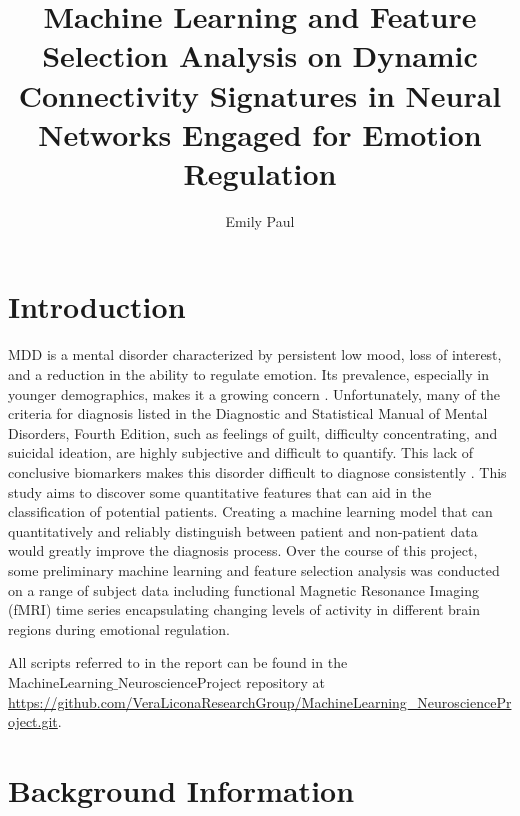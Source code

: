 \documentclass[12pt]{report}
\title{Machine Learning and Feature Selection Analysis on Dynamic Connectivity Signatures in Neural Networks Engaged for Emotion Regulation}
\author{Emily Paul}
\begin{document}
	
	\maketitle
	\tableofcontents
	
	\chapter{Introduction}
	MDD is a mental disorder characterized by persistent low mood, loss of interest, and a reduction in the ability to regulate emotion. Its prevalence, especially in younger demographics, makes it a growing concern \cite{nimh_2019}. Unfortunately, many of the criteria for diagnosis listed in the Diagnostic and Statistical Manual of Mental Disorders, Fourth Edition, such as feelings of guilt, difficulty concentrating, and suicidal ideation, are highly subjective and difficult to quantify. This lack of conclusive biomarkers makes this disorder difficult to diagnose consistently \cite{lemelin1994depression}. This study aims to discover some quantitative features that can aid in the classification of potential patients. Creating a machine learning model that can quantitatively and reliably distinguish between patient and non-patient data would greatly improve the diagnosis process. Over the course of this project, some preliminary machine learning and feature selection analysis was conducted on a range of subject data including functional Magnetic Resonance Imaging (fMRI) time series encapsulating changing levels of activity in different brain regions during emotional regulation.
	
	All scripts referred to in the report can be found in the \\ MachineLearning$\_$NeuroscienceProject repository at  \url{https://github.com/VeraLiconaResearchGroup/MachineLearning_NeuroscienceProject.git}.
	
	\chapter{Background Information}
\end{document}
